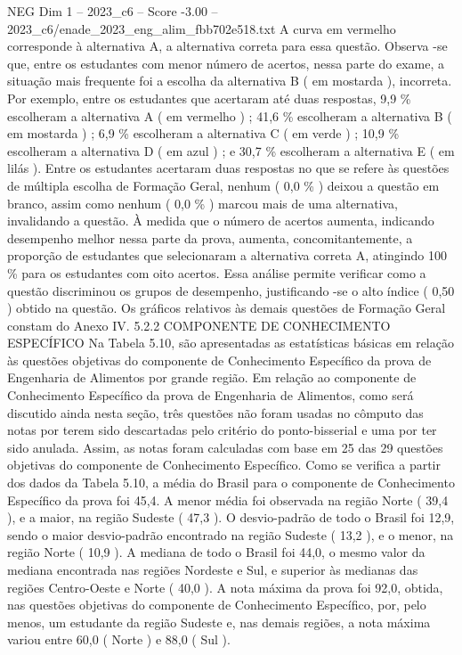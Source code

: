 \begin{textsample}{NEG Dim 1 – 2023\_c6 – Score -3.00 – 2023\_c6/enade\_2023\_eng\_alim\_fbb702e518.txt}
A curva em vermelho corresponde à alternativa A, a alternativa correta para essa questão.
Observa -se que, entre os estudantes com menor número de acertos, nessa parte do exame, a situação mais frequente foi a escolha da alternativa B ( em mostarda ), incorreta.
Por exemplo, entre os estudantes que acertaram até duas respostas, 9,9 \% escolheram a alternativa A ( em vermelho ) ; 41,6 \% escolheram a alternativa B ( em mostarda ) ; 6,9 \% escolheram a alternativa C ( em verde ) ; 10,9 \% escolheram a alternativa D ( em azul ) ; e 30,7 \% escolheram a alternativa E ( em lilás ).
Entre os estudantes acertaram duas respostas no que se refere às questões de múltipla escolha de Formação Geral, nenhum ( 0,0 \% ) deixou a questão em branco, assim como nenhum ( 0,0 \% ) marcou mais de uma alternativa, invalidando a questão.
À medida que o número de acertos aumenta, indicando desempenho melhor nessa parte da prova, aumenta, concomitantemente, a proporção de estudantes que selecionaram a alternativa correta A, atingindo 100 \% para os estudantes com oito acertos.
Essa análise permite verificar como a questão discriminou os grupos de desempenho, justificando -se o alto índice ( 0,50 ) obtido na questão.
Os gráficos relativos às demais questões de Formação Geral constam do Anexo IV. 5.2.2 COMPONENTE DE CONHECIMENTO ESPECÍFICO Na Tabela 5.10, são apresentadas as estatísticas básicas em relação às questões objetivas do componente de Conhecimento Específico da prova de Engenharia de Alimentos por grande região.
Em relação ao componente de Conhecimento Específico da prova de Engenharia de Alimentos, como será discutido ainda nesta seção, três questões não foram usadas no cômputo das notas por terem sido descartadas pelo critério do ponto-bisserial e uma por ter sido anulada.
Assim, as notas foram calculadas com base em 25 das 29 questões objetivas do componente de Conhecimento Específico.
Como se verifica a partir dos dados da Tabela 5.10, a média do Brasil para o componente de Conhecimento Específico da prova foi 45,4.
A menor média foi observada na região Norte ( 39,4 ), e a maior, na região Sudeste ( 47,3 ).
O desvio-padrão de todo o Brasil foi 12,9, sendo o maior desvio-padrão encontrado na região Sudeste ( 13,2 ), e o menor, na região Norte ( 10,9 ).
A mediana de todo o Brasil foi 44,0, o mesmo valor da mediana encontrada nas regiões Nordeste e Sul, e superior às medianas das regiões Centro-Oeste e Norte ( 40,0 ).
A nota máxima da prova foi 92,0, obtida, nas questões objetivas do componente de Conhecimento Específico, por, pelo menos, um estudante da região Sudeste e, nas demais regiões, a nota máxima variou entre 60,0 ( Norte ) e 88,0 ( Sul ).

\end{textsample}
